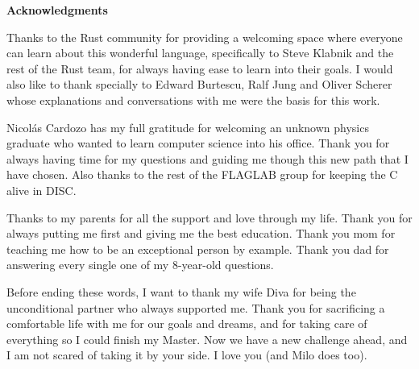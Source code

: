 \clearemptydoublepage
{}
{}

\vspace*{2cm}

\begin{center}
{\Large \textbf{Acknowledgments}}
\end{center}

\vspace{1cm}

Thanks to the Rust community for providing a welcoming space where everyone can
learn about this wonderful language, specifically to Steve Klabnik and the rest
of the Rust team, for always having ease to learn into their goals. I would also
like to thank specially to Edward Burtescu, Ralf Jung and Oliver Scherer whose
explanations and conversations with me were the basis for this work.

Nicolás Cardozo has my full gratitude for welcoming an unknown physics graduate
who wanted to learn computer science into his office. Thank you for always
having time for my questions and guiding me though this new path that I have
chosen. Also thanks to the rest of the FLAGLAB group for keeping the C alive in
DISC.

Thanks to my parents for all the support and love through my life. Thank you
for always putting me first and giving me the best education. Thank you mom for
teaching me how to be an exceptional person by example. Thank you dad for
answering every single one of my 8-year-old questions.

Before ending these words, I want to thank my wife Diva for being the
unconditional partner who always supported me. Thank you for sacrificing a
comfortable life with me for our goals and dreams, and for taking care of
everything so I could finish my Master. Now we have a new challenge ahead, and
I am not scared of taking it by your side. I love you (and Milo does too).
